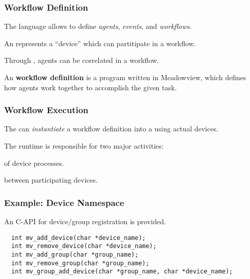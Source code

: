 \documentclass{beamer}
\begin{document}
\begin{frame}[fragile]
\frametitle{Workflow Definition}

The  language allows to define {\em agents\/}, {\em events\/},
and {\em workflows}. 

\vspace*{0.4cm}

An  represents a ``device'' which can partitipate in a workflow.

\vspace*{0.4cm}

Through , agents can be correlated in a workflow.

\vspace*{0.4cm}

An {\bf workflow definition} is a program written in Meadowview, which defines
how agents work together to accomplish the given task.

\end{frame}


\begin{frame}[fragile]
\frametitle{Workflow Execution}

The  can {\em instantiate\/} a workflow definition into a 
 using actual devices.

\vspace*{0.5cm}

The runtime is responsible for two major activities:

\vspace*{0.3cm}

\bit

\w {} of device processes.

\vspace*{0.3cm}

\w {} between participating devices.

\eit

\end{frame}

\begin{frame}[fragile]
\frametitle{Example: Device Namespace}

An C-API for device/group registration is provided.

{\scriptsize
\begin{verbatim}
  int mv_add_device(char *device_name);
  int mv_remove_device(char *device_name);
  int mv_add_group(char *group_name);
  int mv_remove_group(char *group_name);
  int mv_group_add_device(char *group_name, char *device_name);
\end{verbatim}
}
\end{frame}
\end{document}
